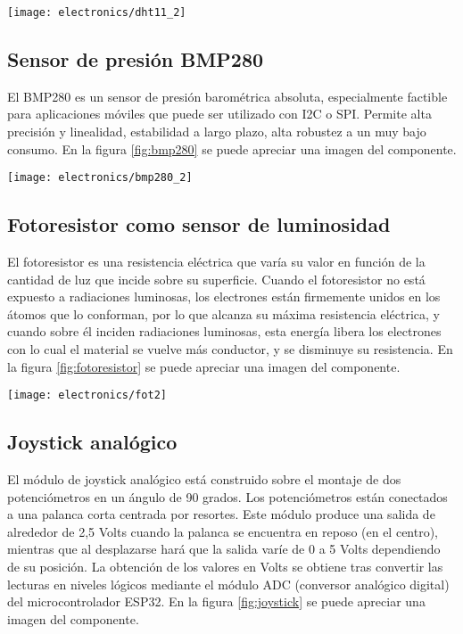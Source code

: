 \begin{center}
   \texttt{[image: electronics/dht11\_2]}
   \label{fig:dht11}
\end{center}

\subsection{Sensor de presión BMP280}

El BMP280 \cite{BMP280_datasheet} es un sensor de presión barométrica absoluta, especialmente factible para aplicaciones móviles que puede ser utilizado con I2C o SPI. Permite alta precisión y linealidad, estabilidad a largo plazo, alta robustez a un muy bajo consumo. En la figura \ref{fig:bmp280} se puede apreciar una imagen del componente.

\begin{center}
   \texttt{[image: electronics/bmp280\_2]}
   \label{fig:bmp280}
\end{center}

\subsection{Fotoresistor como sensor de luminosidad}

El fotoresistor es una resistencia eléctrica que varía su valor en función de la cantidad de luz que incide sobre su superficie.
Cuando el fotoresistor no está expuesto a radiaciones luminosas, los electrones están firmemente unidos en los átomos que lo conforman, por lo que alcanza su máxima resistencia eléctrica, y cuando sobre él inciden radiaciones luminosas, esta energía libera los electrones con lo cual el material se vuelve más conductor, y se disminuye su resistencia. En la figura \ref{fig:fotoresistor} se puede apreciar una imagen del componente.

\begin{center}
   \texttt{[image: electronics/fot2]}
   \label{fig:fotoresistor}
\end{center}


\subsection{Joystick analógico}
El módulo de joystick analógico \cite{analog_joystick_datasheet} está construido sobre el montaje de dos potenciómetros en un ángulo de 90 grados. Los potenciómetros están conectados a una palanca corta centrada por resortes.
Este módulo produce una salida de alrededor de 2,5 Volts cuando la palanca se encuentra en reposo (en el centro), mientras que al desplazarse hará que la salida varíe de 0 a 5 Volts dependiendo de su posición. La obtención de los valores en Volts se obtiene tras convertir las lecturas en niveles lógicos mediante el módulo ADC (conversor analógico digital) \cite{ESP32_adc} del microcontrolador ESP32. En la figura \ref{fig:joystick} se puede apreciar una imagen del componente.


